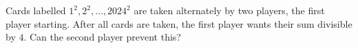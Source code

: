 Cards labelled $1^2,2^2,\ldots,2024^2$ are taken alternately by two players, the first player starting. After all cards are taken, the first player wants their sum divisible by $4$. Can the second player prevent this?
